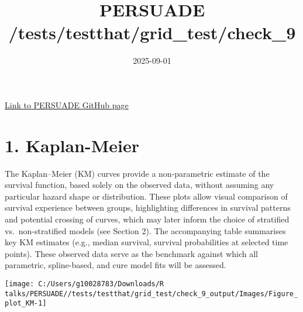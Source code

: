 \documentclass[
]{article}
\title{PERSUADE /tests/testthat/grid\_test/check\_9}
\author{}
\date{\vspace{-2.5em}2025-09-01}
\begin{document}
\maketitle

{
\hypersetup{linkcolor=}
\setcounter{tocdepth}{2}
\tableofcontents
}
\hfill\break

\href{https://github.com/Bram-R/PERSUADE}{Link to PERSUADE GitHub page}

\clearpage

\section{1. Kaplan-Meier}\label{kaplan-meier}

The Kaplan--Meier (KM) curves provide a non-parametric estimate of the
survival function, based solely on the observed data, without assuming
any particular hazard shape or distribution. These plots allow visual
comparison of survival experience between groups, highlighting
differences in survival patterns and potential crossing of curves, which
may later inform the choice of stratified vs.~non-stratified models (see
Section 2). The accompanying table summarises key KM estimates (e.g.,
median survival, survival probabilities at selected time points). These
observed data serve as the benchmark against which all parametric,
spline-based, and cure model fits will be assessed.

\clearpage

\begin{flushleft}\texttt{[image: C:/Users/g10028783/Downloads/R talks/PERSUADE//tests/testthat/grid\_test/check\_9\_output/Images/Figure\_plot\_KM-1]} \end{flushleft}

\begin{table}[H]
\centering
\caption{\label{tab:Table_1}Observed survival data}
\centering
{}
\end{table}
\end{document}
